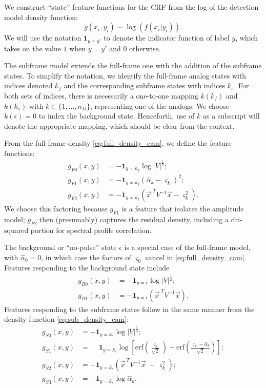 \documentclass[10pt]{article}
\newcommand{\half}{\frac{1}{2}}
\newcommand{\erf}{\mbox{erf}}
\newcommand{\crf}{{\small CRF}}
\begin{document}
We construct ``state'' feature functions for the \crf{} from the log of the detection model density function:
$$
g(x_i,y_i) \sim \log( f(x_i|y_i)).
$$
We will use the notation $\mathbf{1}_{y=y'}$ to denote the indicator function of label $y$, which takes on the value $1$ when $y=y'$ and $0$ otherwise.

The subframe model extends the full-frame one with the addition of the subframe states.
To simplify the notation, we identify the full-frame analog states with indices denoted $k_f$ and the corresponding subframe states with indices $k_s$.
For both sets of indices, there is necessarily a one-to-one mapping $k(k_f)$ and $k(k_s)$ with $k\in\{1,...,n_D\}$,
representing one of the analogs.  We choose $k(\epsilon)=0$ to index the background state.
Henceforth, use of $k$ as a subscript will denote the appropriate mapping, which should be clear from the context.

From the full-frame density \eqref{eq:full_density_cam}, we define the feature functions:
\begin{subequations}
\begin{align}
g_{F0}(x,y) &= -\mathbf{1}_{y=k_f} \log |V|^\half; \\
g_{F1}(x,y) &= -\mathbf{1}_{y=k_f}(\hat{\alpha}_k - \varsigma_k)^2; \\
g_{F2}(x,y) &= -\mathbf{1}_{y=k_f}(\vec{x}^{\;T} V^{-1} \vec{x} - \varsigma_k^2).
\end{align}
\end{subequations}
We choose this factoring because $g_{F1}$ is a feature that isolates the amplitude model; $g_{F2}$ then (presumably) captures the residual density, including a chi-squared portion for spectral profile correlation.   

The background or ``no-pulse'' state $\epsilon$ is a special case of the full-frame model,
with $\hat{\alpha}_0 = 0$, in which case the factors of $\varsigma_0$ cancel in \eqref{eq:full_density_cam}.     
Features responding to the background state include
\begin{subequations}
\begin{align}
g_{B0}(x,y) &= -\mathbf{1}_{y=\epsilon} \log |V|^\half; \\
g_{B1}(x,y) &= -\mathbf{1}_{y=\epsilon} (\vec{x}^{\;T} V^{-1} \vec{x}).
\end{align}
\end{subequations}
Features responding to the subframe states follow in the same manner from the density function \eqref{eq:sub_density_cam}:
\begin{subequations}
\begin{align}
g_{S0}(x,y) &= -\mathbf{1}_{y=k_s} \log |V|^\half; \\
g_{S1}(x,y) &= \phantom{-}\mathbf{1}_{y=k_s} \log \left[ \erf \left( \frac{\varsigma_k}{\sqrt{2}}\right)
                                             - \erf \left( \frac{\varsigma_k - \hat{\alpha}_k}{\sqrt{2}} \right)\right];\\
g_{S2}(x,y) &= -\mathbf{1}_{y=k_s}(\vec{x}^{\:T} V^{-1}\vec{x} \:-\: \varsigma_k^2); \\
g_{S3}(x,y) &= -\mathbf{1}_{y=k_s} \log \hat{\alpha}_k.
\end{align}
\end{subequations}
\end{document}

